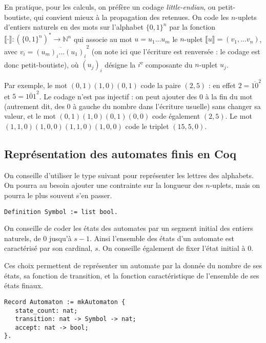 \documentclass{article}
\begin{document}
En pratique, pour les calculs, on préfère un codage \emph{little-endian}, ou
petit-boutiste, qui convient mieux à la propagation des retenues.  On
code les \(n\)-uplets d'entiers naturels en des mots sur l'alphabet
\(\{0,1\}^n\) par la fonction
\(\llbracket \cdot \rrbracket : (\{0,1\}^n)^* \rightarrow \mathbb
N^n\) qui associe au mot \(u = u_1 \dots u_m\) le \(n\)-uplet
\(\llbracket u \rrbracket = (v_1, \dots v_n)\), avec
\(v_i = \overline{(u_m)_i \dots (u_1)_i}^2\) (on note ici que
l'écriture est renversée : le codage est donc petit-boutiste), où \((u_j)_i\) désigne la
\(i\)\textsuperscript{e} composante du \(n\)-uplet \(u_j\).

Par exemple, le mot \((0,1)(1,0)(0,1)\) code la paire \((2,5)\)
: en effet \(2 = \overline{10}^2\) et \(5 = \overline{101}^2\). Le
codage n'est pas injectif : on peut ajouter des 0 à la fin du mot
(autrement dit, des 0 à gauche du nombre dans l'écriture usuelle) sans
changer sa valeur, et le mot \((0,1)(1,0)(0,1)(0,0)\) code également
\((2,5)\). Le mot \((1,1,0)(1,0,0)(1,1,0)(1,0,0)\) code le triplet \((15,5,0)\).

\subsection{Représentation des automates finis en Coq}

On conseille d'utiliser le type suivant pour représenter les lettres
des alphabets. On pourra au besoin ajouter une contrainte sur la
longueur des \(n\)-uplets, mais on pourra le plus souvent s'en passer.

\begin{verbatim}
Definition Symbol := list bool.
\end{verbatim}

On conseille de coder les états des automates par un segment initial
des entiers naturels, de 0 jusqu'à \(s-1\).  Ainsi l'ensemble des
états d'un automate est caractérisé par son cardinal, \(s\). On
conseille également de fixer l'état initial à 0.

Ces choix permettent de représenter un automate par la donnée du
nombre de ses états, sa fonction de transition, et la fonction
caractéristique de l'ensemble de ses états finaux.

\begin{verbatim}
Record Automaton := mkAutomaton {
   state_count: nat;
   transition: nat -> Symbol -> nat;
   accept: nat -> bool;
}.
\end{verbatim}
\end{document}
